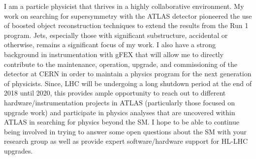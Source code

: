 I am a particle physicist that thrives in a highly collaborative environment. My work on searching for supersymmetry with the ATLAS detector pioneered the use of boosted object reconstruction techniques to extend the results from the Run 1 program. Jets, especially those with significant substructure, accidental or otherwise, remains a significant focus of my work. I also have a strong background in instrumentation with gFEX that will allow me to directly contribute to the maintenance, operation, upgrade, and commissioning of the detector at CERN in order to maintain a physics program for the next generation of physicists. Since, LHC will be undergoing a long shutdown period at the end of 2018 until 2020, this provides ample opportunity to reach out to different hardware/instrumentation projects in ATLAS (particularly those focused on upgrade work) and participate in physics analyses that are uncovered within ATLAS in searching for physics beyond the SM. I hope to be able to continue being involved in trying to answer some open questions about the SM with your research group as well as provide expert software/hardware support for HL-LHC upgrades.

\vspace{0.5cm}

\begin{footnotesize}


\end{footnotesize}


